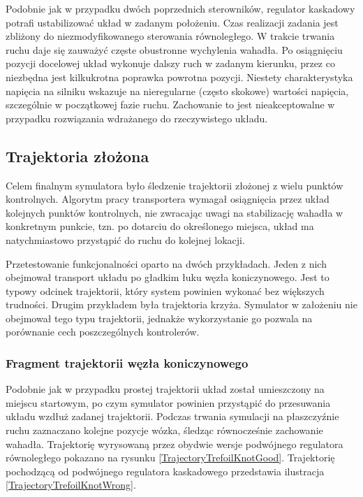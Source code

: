 \documentclass[12pt, oneside]{report}
\theoremstyle{definition}
\begin{document}
Podobnie jak w przypadku dwóch poprzednich sterowników, regulator kaskadowy potrafi ustabilizować układ w zadanym położeniu. Czas realizacji zadania jest zbliżony do niezmodyfikowanego sterowania równoległego. W trakcie trwania ruchu daje się zauważyć częste obustronne wychylenia wahadła. Po osiągnięciu pozycji docelowej układ wykonuje dalszy ruch w zadanym kierunku, przez co niezbędna jest kilkukrotna poprawka powrotna pozycji. Niestety charakterystyka napięcia na silniku wskazuje na nieregularne (często skokowe) wartości napięcia, szczególnie w początkowej fazie ruchu. Zachowanie to jest nieakceptowalne w przypadku rozwiązania wdrażanego do rzeczywistego układu. 

\subsection{Trajektoria złożona}
Celem finalnym symulatora było śledzenie trajektorii złożonej z wielu punktów kontrolnych. Algorytm pracy transportera wymagał osiągnięcia przez układ kolejnych punktów kontrolnych, nie zwracając uwagi na stabilizację wahadła w konkretnym punkcie, tzn. po dotarciu do określonego miejsca, układ ma natychmiastowo przystąpić do ruchu do kolejnej lokacji. 

Przetestowanie funkcjonalności oparto na dwóch przykładach. Jeden z nich obejmował transport układu po gładkim łuku węzła koniczynowego. Jest to typowy odcinek trajektorii, który system powinien wykonać bez większych trudności. Drugim przykładem była trajektoria krzyża. Symulator w założeniu nie obejmował tego typu trajektorii, jednakże wykorzystanie go pozwala na porównanie cech poszczególnych kontrolerów. 

\subsubsection{Fragment trajektorii węzła koniczynowego}
Podobnie jak w przypadku prostej trajektorii układ został umieszczony na miejscu startowym, po czym symulator powinien przystąpić do przesuwania układu wzdłuż zadanej trajektorii. Podczas trwania symulacji na płaszczyźnie ruchu zaznaczano kolejne pozycje wózka, śledząc równocześnie zachowanie wahadła. Trajektorię wyrysowaną przez obydwie wersje podwójnego regulatora równoległego pokazano na rysunku \ref{TrajectoryTrefoilKnotGood}. Trajektorię pochodzącą od podwójnego regulatora kaskadowego przedstawia ilustracja \ref{TrajectoryTrefoilKnotWrong}.
\end{document}
